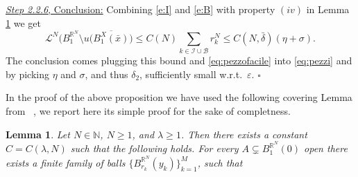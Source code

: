 \documentclass[reqno,11pt]{article}
\numberwithin{equation}{section}
\newcommand{\N}{\mathbb{N}}
\newcommand{\R}{\mathbb{R}}
\newcommand{\eps}{\varepsilon}
\renewenvironment{proof}{\removelastskip\par\medskip   %
\noindent{\em Proof} \rm}{\penalty-20\null\hfill$\square$\par\medbreak}
\newtheorem{lemma}[theorem]{Lemma}
\newcommand{\LL}{{\mathcal L}}
\begin{document}
\begin{proof}
{\underline{\emph{Step 2.2.6}, Conclusion:} 
Combining \eqref{e:I} and \eqref{e:B} with  property $(iv)$ in Lemma \ref{le:colding2}  we get 
\[
\mathcal L^N\big(B^{\mathbb R^N}_1\setminus u(\overline{B^X_1(\bar x)}\big)\leq C(N)\sum_{k\in \mathcal I\cup \mathcal B} r_k^N \le C(N, \bar \delta)(\eta+\sigma).
\]
The conclusion comes plugging this bound and \eqref{eq:pezzofacile} into \eqref{eq:pezzi} and  by picking $\eta$ and \(\sigma\), and thus $\delta_2$, sufficiently small w.r.t.\ $\eps$.}
\end{proof}

In the proof of the above proposition we have used the following  covering {Lemma from ~\cite{Colding97}, we report here its simple proof for the sake of completness}.
\begin{lemma}\label{le:colding2}Let $N\in\N$, $N\geq 1$, and $\lambda\geq 1$. Then there exists a constant $C=C(\lambda,N)$ such that the following holds. For every  \(A\subsetneq B_1^{\R^N}(0)\) open  there exists a finite family of balls \(\{B^{\R^N}_{r_k}(y_k)\}_{k=1}^M\),  such that
\end{lemma}
\end{document}
